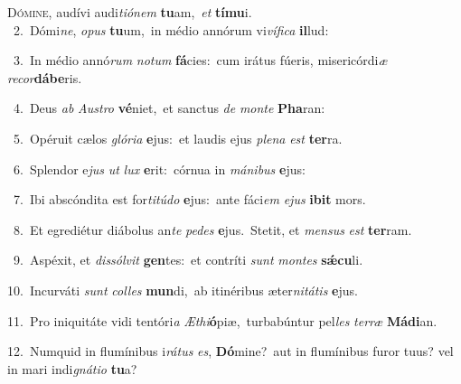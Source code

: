 \lettrine{\initial\textcolor{\initialcolor}{D}}{ómine,} audívi audi\-\textit{ti}\-\textit{ó}\textit{nem} \textbf{tu}\-am,~\star \textit{et} \textbf{tí}\-\textbf{mu}i.\\
{\numbfont\textcolor{\numbcolor}{~2.}}~Dómi\-\textit{ne}\-, \textit{o}\-\textit{pus} \textbf{tu}\-um,~\star in médio annórum vi\-\textit{ví}\-\textit{fi}\textit{ca} \textbf{il}\-lud:\par
{\numbfont\textcolor{\numbcolor}{~3.}}~In médio annó\textit{rum} \textit{no}\-\textit{tum} \textbf{fá}\-cies:~\star cum irátus fúeris, misericórdi\textit{æ} \textit{re}\-\textit{cor}\textbf{dá}\textbf{be}ris.\par
{\numbfont\textcolor{\numbcolor}{~4.}}~Deus \textit{ab} \textit{Aus}\-\textit{tro} \textbf{vé}\-niet,~\star et sanctus \textit{de} \textit{mon}\-\textit{te} \textbf{Pha}\-ran:\par
{\numbfont\textcolor{\numbcolor}{~5.}}~Opéruit cælos \textit{gló}\-\textit{ri}\textit{a} \textbf{e}\-jus:~\star et laudis ejus \textit{ple}\-\textit{na} \textit{est} \textbf{ter}\-ra.\par
{\numbfont\textcolor{\numbcolor}{~6.}}~Splendor e\textit{jus} \textit{ut} \textit{lux} \textbf{e}\-rit:~\star córnua in \textit{má}\-\textit{ni}\textit{bus} \textbf{e}\-jus:\par
{\numbfont\textcolor{\numbcolor}{~7.}}~Ibi abscóndita est for\-\textit{ti}\-\textit{tú}\textit{do} \textbf{e}\-jus:~\star ante fáci\textit{em} \textit{e}\-\textit{jus} \textbf{i}\-\textbf{bit} mors.\par
{\numbfont\textcolor{\numbcolor}{~8.}}~Et egrediétur diábolus an\textit{te} \textit{pe}\-\textit{des} \textbf{e}\-jus.~\star Stetit, et \textit{men}\-\textit{sus} \textit{est} \textbf{ter}\-ram.\par
{\numbfont\textcolor{\numbcolor}{~9.}}~Aspéxit, et \textit{dis}\-\textit{sól}\textit{vit} \textbf{gen}\-tes:~\star et contríti \textit{sunt} \textit{mon}\-\textit{tes} \textbf{sǽ}\-\textbf{cu}li.\par
{\numbfont\textcolor{\numbcolor}{10.}}~Incurváti \textit{sunt} \textit{col}\-\textit{les} \textbf{mun}\-di,~\star ab itinéribus æter\-\textit{ni}\-\textit{tá}\textit{tis} \textbf{e}\-jus.\par
{\numbfont\textcolor{\numbcolor}{11.}}~Pro iniquitáte vidi tentóri\textit{a} \textit{Æ}\-\textit{thi}\textbf{ó}piæ,~\star turbabúntur pel\textit{les} \textit{ter}\-\textit{ræ} \textbf{Má}\-\textbf{di}an.\par
{\numbfont\textcolor{\numbcolor}{12.}}~Numquid in flumínibus i\-\textit{rá}\-\textit{tus} \textit{es}\-, \textbf{Dó}\-mine?~\star aut in flumínibus furor tuus? vel in mari indi\-\textit{gná}\-\textit{ti}\textit{o} \textbf{tu}\-a?\par
